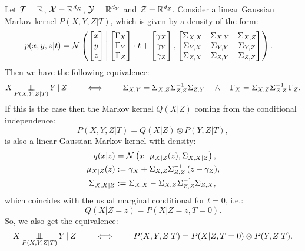\begin{Thm}
Let $\mathcal{T} = \mathbb{R}$, $\mathcal{X} = \mathbb{R}^{d_X}$, $\mathcal{Y} = \mathbb{R}^{d_Y}$ and $\mathcal{Z} = \mathbb{R}^{d_Z}$. 
Consider a linear Gaussian Markov kernel $P(X,Y,Z|T)$, which is given by a density of the form:
\begin{align*}
    p(x,y,z|t) &= \mathcal{N}\left ( \begin{bmatrix}x\\y\\z\end{bmatrix} \,\middle|\, \begin{bmatrix}\Gamma_X\\\Gamma_Y\\\Gamma_Z\end{bmatrix} \cdot t + \begin{bmatrix}\gamma_X\\\gamma_Y\\\gamma_Z\end{bmatrix} , \begin{bmatrix}\Sigma_{X,X}&\Sigma_{X,Y}&\Sigma_{X,Z}\\\Sigma_{Y,X}&\Sigma_{Y,Y}&\Sigma_{Y,Z}\\\Sigma_{Z,X}&\Sigma_{Z,Y}&\Sigma_{Z,Z}\end{bmatrix} \right ). 
\end{align*}
Then we have the following equivalence:
\[X \operatorname*{\perp\mkern-11mu\perp}_{P(X,Y,Z|T)} Y \operatorname*{|} Z \qquad \iff \qquad \Sigma_{X,Y} = \Sigma_{X,Z} \Sigma_{Z,Z}^{-1}\Sigma_{Z,Y} 
\quad \land \quad \Gamma_X = \Sigma_{X,Z}\Sigma_{Z,Z}^{-1}\,\Gamma_Z. \]
If this is the case then the Markov kernel $Q(X|Z)$ coming from the conditional independence:
\[P(X,Y,Z|T) = Q(X|Z) \otimes P(Y,Z|T),\]
is also a linear Gaussian Markov kernel with density:
\begin{align*}
    q(x|z) &= \mathcal{N}\left ( x \,\middle|\, \mu_{X|Z}(z), \Sigma_{X,X|Z} \right ),\\ 
    \mu_{X|Z}(z)   &:= \gamma_X + \Sigma_{X,Z}\Sigma_{Z,Z}^{-1}\, (z-\gamma_Z),\\
    \Sigma_{X,X|Z} & := \Sigma_{X,X} - \Sigma_{X,Z}\Sigma_{Z,Z}^{-1} \Sigma_{Z,X},
\end{align*}
which coincides with the usual marginal conditional for $t=0$, i.e.:
\[Q(X|Z=z) = P(X|Z=z,T=0).\]
So, we also get the equivalence:
\[X \operatorname*{\perp\mkern-11mu\perp}_{P(X,Y,Z|T)} Y \operatorname*{|} Z \qquad \iff \qquad P(X,Y,Z|T) = P(X|Z,T=0) \otimes P(Y,Z|T). \]
\end{Thm}

